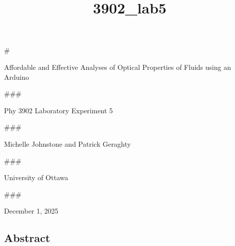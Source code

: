 \documentclass[11pt]{article}
\title{3902\_lab5}
\begin{document}
    
    \maketitle
    
    

    
    \#

Affordable and Effective Analyses of Optical Properties of Fluids using
an Arduino

    

    

    

    

    

    

    

    

    

    

    

    

    

    \#\#\#

Phy 3902 Laboratory Experiment 5

    

    

    

    

    

    

    

    

    

    

    

    

    

    \#\#\#

Michelle Johnstone and Patrick Geraghty

    \#\#\#

University of Ottawa

    \#\#\#

December 1, 2025

    \hypertarget{abstract}{%
\subsection{Abstract}\label{abstract}}
\end{document}
